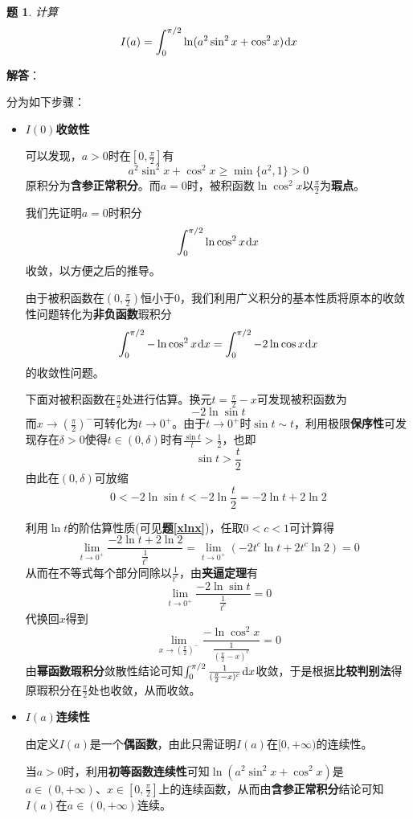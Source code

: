 \documentclass[a4paper,UTF8,fontset=windows,AutoFakeBold]{ctexart}
\newcommand*{\dr}{\hspace{0.07em}\mathrm{d}}
\theoremstyle{ex}
\newtheorem{exercise}{题}
\newcommand{\exref}[1]{\textbf{题\;\ref{#1}\;}}
\newcommand{\sol}[1]{{\vspace{5pt}\kaishu\noindent\textbf{解答}：\vspace{-3pt}
\begin{compactitem}
    \item[] #1
\end{compactitem}
}}
\begin{document}
\begin{framed}
\begin{exercise}\label{inner deri}
    计算
    $$I(a)=\int_0^{\pi/2}\ln(a^2\sin^2x+\cos^2x)\dr x$$
\end{exercise}
\sol{
    分为如下步骤：
    \begin{itemize}
        \item \textbf{$I(0)$收敛性}
        
        可以发现，$a>0$时在$[0,\frac{\pi}{2}]$有
        $$a^2\sin^2x+\cos^2x\ge\min\{a^2,1\}>0$$
        原积分为\textbf{含参正常积分}。而$a=0$时，被积函数$\ln\cos^2x$以$\frac{\pi}{2}$为\textbf{瑕点}。

        我们先证明$a=0$时积分
        $$\int_0^{\pi/2}\ln\cos^2x\dr x$$
        收敛，以方便之后的推导。

        由于被积函数在$(0,\frac{\pi}{2})$恒小于0，我们利用广义积分的基本性质将原本的收敛性问题转化为\textbf{非负函数}瑕积分
        $$\int_0^{\pi/2}-\ln\cos^2x\dr x=\int_0^{\pi/2}-2\ln\cos x\dr x$$
        的收敛性问题。

        下面对被积函数在$\frac{\pi}{2}$处进行估算。换元$t=\frac{\pi}{2}-x$可发现被积函数为
        $$-2\ln\sin t$$
        而$x\to(\frac{\pi}{2})^-$可转化为$t\to0^+$。由于$t\to0^+$时$\sin t\sim t$，利用极限\textbf{保序性}可发现存在$\delta>0$使得$t\in(0,\delta)$时有$\frac{\sin t}{t}>\frac{1}{2}$，也即$$\sin t>\frac{t}{2}$$
        由此在$(0,\delta)$可放缩
        $$0<-2\ln\sin t<-2\ln\frac{t}{2}=-2\ln t+2\ln2$$
        
        利用$\ln t$的阶估算性质(可见\exref{xlnx})，任取$0<c<1$可计算得
        $$\lim_{t\to0^+}\frac{-2\ln t+2\ln 2}{\frac{1}{t^c}}=\lim_{t\to0^+}(-2t^c\ln t+2t^c\ln 2)=0$$
        从而在不等式每个部分同除以$\frac{1}{t^c}$，由\textbf{夹逼定理}有
        $$\lim_{t\to0^+}\frac{-2\ln\sin t}{\frac{1}{t^c}}=0$$
        代换回$x$得到
        $$\lim_{x\to(\frac{\pi}{2})^-}\frac{-\ln\cos^2x}{\frac{1}{(\frac{\pi}{2}-x)^c}}=0$$
        由\textbf{幂函数瑕积分}敛散性结论可知$\int_0^{\pi/2}\frac{1}{(\frac{\pi}{2}-x)^c}\dr x$收敛，于是根据\textbf{比较判别法}得原瑕积分在$\frac{\pi}{2}$处也收敛，从而收敛。

        \item \textbf{$I(a)$连续性}
        
        由定义$I(a)$是一个\textbf{偶函数}，由此只需证明$I(a)$在$[0,+\infty)$的连续性。
        
        当$a>0$时，利用\textbf{初等函数连续性}可知$\ln(a^2\sin^2x+\cos^2x)$是$a\in(0,+\infty)$、$x\in[0,\frac{\pi}{2}]$上的连续函数，从而由\textbf{含参正常积分}结论可知$I(a)$在$a\in(0,+\infty)$连续。


\end{itemize}}
\end{framed}
\end{document}
